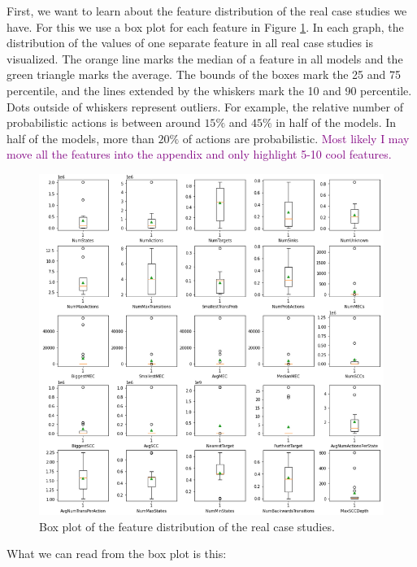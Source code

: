 First, we want to learn about the feature distribution of the real case studies we have. 
For this we use a box plot for each feature in Figure \ref{fig:Real_FeatureDistribution}.
In each graph, the distribution of the values of one separate feature in all real case studies is visualized. 
The orange line marks the median of a feature in all models and the green triangle marks the average.
The bounds of the boxes mark the 25 and 75 percentile, and the lines extended by the whiskers mark the 10 and 90 percentile.
Dots outside of whiskers represent outliers.
For example, the relative number of probabilistic actions is between around $15\%$ and $45\%$ in half of the models.
In half of the models, more than $20\%$ of actions are probabilistic.
\textcolor{purple}{Most likely I may move all the features into the appendix and only highlight 5-10 cool features.}
\begin{figure}[t]
    \centering
    \includegraphics[width=1\textwidth]{figures/Real_FeatureDistribution.png}
    \caption[Feature Distribution of the case studies]{
        Box plot of the feature distribution of the real case studies.
    }
    \label{fig:Real_FeatureDistribution}
\end{figure}
What we can read from the box plot is this:
